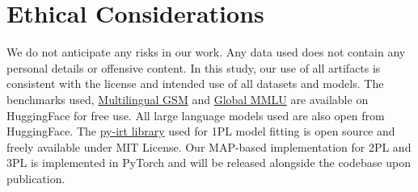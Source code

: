 \documentclass[11pt]{article}
\begin{document}
\section*{Ethical Considerations}

We do not anticipate any risks in our work. Any data used does not contain any personal details or offensive content. In this study, our use of all artifacts is consistent with the license and intended use of all datasets and models. The benchmarks used, \href{https://huggingface.co/datasets/juletxara/mgsm}{Multilingual GSM} \cite{shi2023language} and \href{https://huggingface.co/datasets/CohereLabs/Global-MMLU}{Global MMLU}\cite{singh2025global} are available on HuggingFace for free use. All large language models used are also open from HuggingFace. The \href{https://pypi.org/project/py-irt/}{py-irt library} used for 1PL model fitting is open source and freely available under MIT License. Our MAP-based implementation for 2PL and 3PL is implemented in PyTorch and will be released alongside the codebase upon publication.

\end{document}
